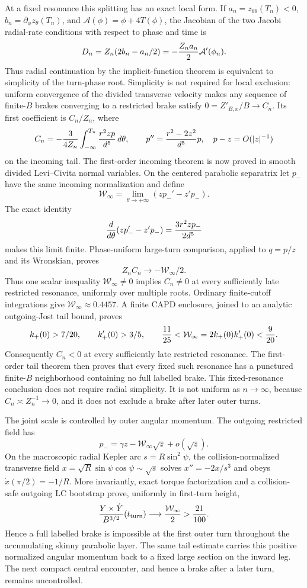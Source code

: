 \documentclass[11pt]{article}
\begin{document}
At a fixed resonance this splitting has an exact local form. If
$a_n=z_{\theta\theta}(T_n)<0$, $b_n=\partial_\phi z_\theta(T_n)$, and
$\mathcal A(\phi)=\phi+4T(\phi)$, the Jacobian of the two Jacobi radial-rate
conditions with respect to phase and time is
\[
D_n=Z_n(2b_n-a_n/2)
=-{Z_na_n\over2}\mathcal A'(\phi_n).
\]
Thus radial continuation by the implicit-function theorem is equivalent to
simplicity of the turn-phase root. Simplicity is not required for local
exclusion: uniform convergence of the divided transverse velocity makes any
sequence of finite-$B$ brakes converging to a restricted brake satisfy
$0=Z'_{B,x}/B\to C_n$. Its first coefficient is
$C_n/Z_n$, where
\[
C_n=-{3\over4Z_n}\int_{-\infty}^{T_n}{r^2zp\over d^5}\,d\theta,\qquad
p''={r^2-2z^2\over d^5}p,\quad p-z=O(|z|^{-1})
\]
on the incoming tail. The first-order incoming theorem is now proved in
smooth divided Levi--Civita normal variables. On the centered parabolic
separatrix let $p_-$ have the same incoming normalization and define
\[
\mathcal W_\infty=\lim_{\theta\to+\infty}
  (zp_-'-z'p_-).
\]
The exact identity
\[
{d\over d\theta}(zp_-'-z'p_-)
={3r^2zp_-\over2d^5}
\]
makes this limit finite. Phase-uniform large-turn comparison, applied to
$q=p/z$ and its Wronskian, proves
\[
\boxed{Z_nC_n\longrightarrow-\mathcal W_\infty/2.}
\]
Thus one scalar inequality $\mathcal W_\infty\ne0$ implies $C_n\ne0$ at
every sufficiently late restricted resonance, uniformly over multiple roots.
Ordinary finite-cutoff integrations give
$\mathcal W_\infty\approx0.4457$. A finite CAPD enclosure, joined to an
analytic outgoing-Jost tail bound, proves
\[
k_+(0)>7/20,\qquad k_+'(0)>3/5,
\qquad {11\over25}<\mathcal W_\infty=2k_+(0)k_+'(0)<{9\over20}.
\]
Consequently $C_n<0$ at every sufficiently late restricted resonance. The
first-order tail theorem then proves that every fixed such resonance has a
punctured finite-$B$ neighborhood containing no full labelled brake. This
fixed-resonance conclusion does not require radial simplicity. It is not
uniform as $n\to\infty$, because $C_n\asymp Z_n^{-1}\to0$, and it does not
exclude a brake after later outer turns.

The joint scale is controlled by outer angular momentum. The outgoing restricted
field has
\[
p_- = \gamma z-\mathcal W_\infty\sqrt z+o(\sqrt z).
\]
On the macroscopic radial Kepler arc
$s=R\sin^2\psi$, the collision-normalized transverse field
$x=\sqrt R\sin\psi\cos\psi\sim\sqrt s$ solves $x''=-2x/s^3$ and obeys
$\dot x(\pi/2)=-1/R$. More invariantly, exact torque factorization and a
collision-safe outgoing LC bootstrap prove, uniformly in first-turn height,
\[
{Y\times\dot Y\over B^{3/2}}(t_{\rm turn})
\longrightarrow{\mathcal W_\infty\over2}>{21\over100}.
\]
Hence a full labelled brake is impossible at the first outer turn throughout
the accumulating skinny parabolic layer. The same tail estimate carries this
positive normalized angular momentum back to a fixed large section on the
inward leg. The next compact central encounter, and hence a brake after a
later turn, remains uncontrolled.
\end{document}
